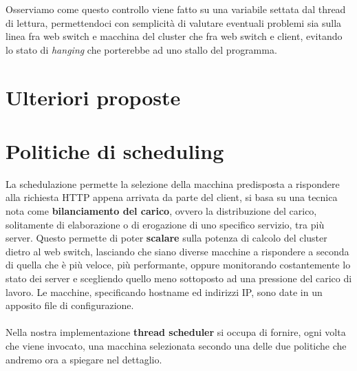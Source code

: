 \documentclass[italian]{tktltiki2}
\begin{document}
Osserviamo come questo controllo viene fatto su una variabile settata dal thread di lettura, permettendoci con semplicità di valutare eventuali problemi sia sulla linea fra web switch e macchina del cluster che fra web switch e client, evitando lo stato di \emph{hanging} che porterebbe ad uno stallo del programma.
\newpage
\section{Ulteriori proposte}

\newpage
\section{Politiche di scheduling}
 \label{sec: sched_p}
La schedulazione permette la selezione della macchina predisposta a rispondere alla richiesta HTTP appena arrivata da parte del client, si basa su una tecnica nota come \textbf{bilanciamento del carico}, ovvero la distribuzione del carico, solitamente di elaborazione o di erogazione di uno specifico servizio, tra più server. Questo permette di poter \textbf{scalare} sulla potenza di calcolo del cluster dietro al web switch, lasciando che siano diverse macchine a rispondere a seconda di quella che è più veloce, più performante, oppure monitorando costantemente lo stato dei server e scegliendo quello meno sottoposto ad una pressione del carico di lavoro. Le macchine, specificando hostname ed indirizzi IP, sono date in un apposito file di configurazione.
\\
\\
Nella nostra implementazione \textbf{thread scheduler} si occupa di fornire,  ogni volta che viene invocato, una macchina selezionata secondo una delle due politiche che andremo ora a spiegare nel dettaglio.
\end{document}

